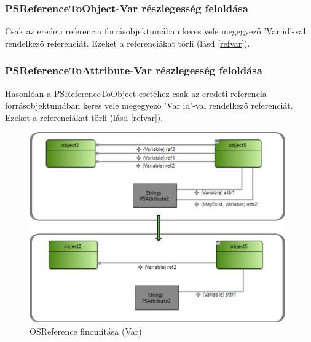 \subsubsection{PSReferenceToObject-Var részlegesség feloldása}
Csak az eredeti referencia forrásobjektumában keres vele megegyező 'Var id'-val rendelkező referenciát. Ezeket a referenciákat törli (lásd \autoref{refvar}).


\subsubsection{PSReferenceToAttribute-Var részlegesség feloldása}
Hasonlóan a PSReferenceToObject esetéhez csak az eredeti referencia forrásobjektumában keres vele megegyező 'Var id'-val rendelkező referenciát. Ezeket a referenciákat törli (lásd \autoref{refvar}).

\begin{figure}[!ht]
	\centering
	\includegraphics[width=110mm]{figures/refvar.pdf}
	\caption{OSReference finomítása (Var)}
	\label{refvar} 
\end{figure}